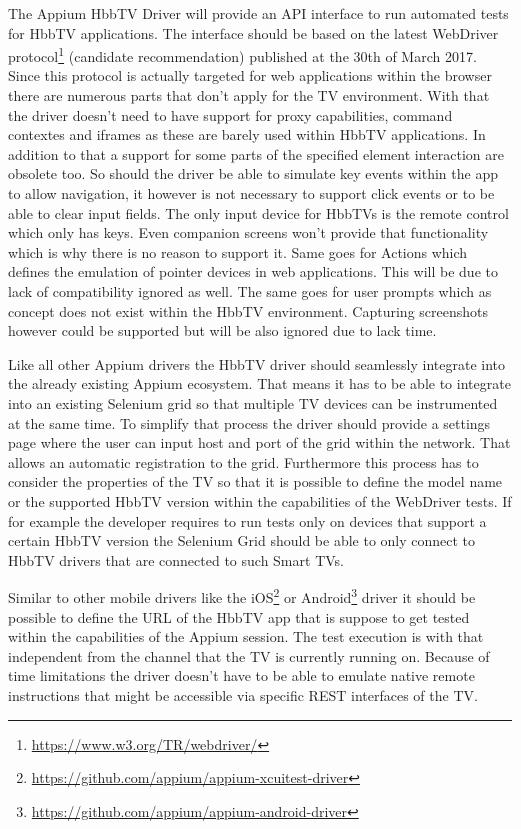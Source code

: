 The Appium HbbTV Driver will provide an API interface to run automated tests for HbbTV
applications. The interface should be based on the latest WebDriver protocol\footnote{\url{https://www.w3.org/TR/webdriver/}} (candidate
recommendation) published at the 30th of March 2017. Since this protocol is actually targeted
for web applications within the browser there are numerous parts that don't apply for the
TV environment. With that the driver doesn't need to have support for proxy capabilities,
command contextes and iframes as these are barely used within HbbTV applications. In addition
to that a support for some parts of the specified element interaction are obsolete too. So
should the driver be able to simulate key events within the app to allow navigation, it
however is not necessary to support click events or to be able to clear input fields. The
only input device for HbbTVs is the remote control which only has keys. Even companion screens
won't provide that functionality which is why there is no reason to support it. Same goes
for Actions which defines the emulation of pointer devices in web applications. This will
be due to lack of compatibility ignored as well. The same goes for user prompts which as
concept does not exist within the HbbTV environment. Capturing screenshots however could
be supported but will be also ignored due to lack time.

Like all other Appium drivers the HbbTV driver should seamlessly integrate into the already
existing Appium ecosystem. That means it has to be able to integrate into an existing
Selenium grid so that multiple TV devices can be instrumented at the same time. To simplify
that process the driver should provide a settings page where the user can input host and port
of the grid within the network. That allows an automatic registration to the grid. Furthermore
this process has to consider the properties of the TV so that it is possible to define the
model name or the supported HbbTV version within the capabilities of the WebDriver tests.
If for example the developer requires to run tests only on devices that support a certain
HbbTV version the Selenium Grid should be able to only connect to HbbTV drivers that are
connected to such Smart TVs.

Similar to other mobile drivers like the iOS\footnote{\url{https://github.com/appium/appium-xcuitest-driver}}
or Android\footnote{\url{https://github.com/appium/appium-android-driver}} driver it should
be possible to define the URL of the HbbTV app that is suppose to get tested within the
capabilities of the Appium session. The test execution is with that independent from the
channel that the TV is currently running on. Because of time limitations the driver doesn't
have to be able to emulate native remote instructions that might be accessible via specific
REST interfaces of the TV.

